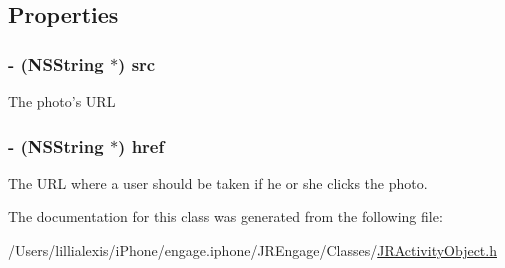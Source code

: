 \subsection{Properties}
\hypertarget{interface_j_r_image_media_object_aad75823f9189dfca758bc4d4712c3621}{
\subsubsection[{src}]{\setlength{\rightskip}{0pt plus 5cm}-\/ (NSString $\ast$) src}}
\label{interface_j_r_image_media_object_aad75823f9189dfca758bc4d4712c3621}
The photo's URL \hypertarget{interface_j_r_image_media_object_a95642c3f4bc97a112a3ab32beef46f66}{
\subsubsection[{href}]{\setlength{\rightskip}{0pt plus 5cm}-\/ (NSString $\ast$) href}}
\label{interface_j_r_image_media_object_a95642c3f4bc97a112a3ab32beef46f66}
The URL where a user should be taken if he or she clicks the photo. 

The documentation for this class was generated from the following file:\begin{DoxyCompactItemize}
\item 
/Users/lillialexis/iPhone/engage.iphone/JREngage/Classes/\hyperlink{_j_r_activity_object_8h}{JRActivityObject.h}\end{DoxyCompactItemize}
